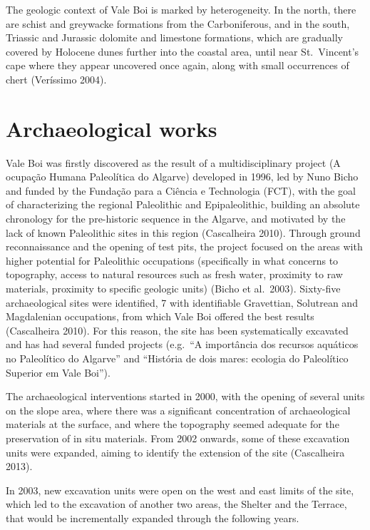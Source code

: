 \documentclass[12pt,twoside]{reedthesis}
\begin{document}
The geologic context of Vale Boi is marked by heterogeneity. In the north, there are schist and greywacke formations from the Carboniferous, and in the south, Triassic and Jurassic dolomite and limestone formations, which are gradually covered by Holocene dunes further into the coastal area, until near St.~Vincent's cape where they appear uncovered once again, along with small occurrences of chert (Veríssimo 2004).

\hypertarget{archaeological-works}{%
\section{Archaeological works}\label{archaeological-works}}

Vale Boi was firstly discovered as the result of a multidisciplinary project (A ocupação Humana Paleolítica do Algarve) developed in 1996, led by Nuno Bicho and funded by the Fundação para a Ciência e Technologia (FCT), with the goal of characterizing the regional Paleolithic and Epipaleolithic, building an absolute chronology for the pre-historic sequence in the Algarve, and motivated by the lack of known Paleolithic sites in this region (Cascalheira 2010). Through ground reconnaissance and the opening of test pits, the project focused on the areas with higher potential for Paleolithic occupations (specifically in what concerns to topography, access to natural resources such as fresh water, proximity to raw materials, proximity to specific geologic units) (Bicho et al.~2003). Sixty-five archaeological sites were identified, 7 with identifiable Gravettian, Solutrean and Magdalenian occupations, from which Vale Boi offered the best results (Cascalheira 2010). For this reason, the site has been systematically excavated and has had several funded projects (e.g.~``A importância dos recursos aquáticos no Paleolítico do Algarve'' and ``História de dois mares: ecologia do Paleolítico Superior em Vale Boi'').

The archaeological interventions started in 2000, with the opening of several units on the slope area, where there was a significant concentration of archaeological materials at the surface, and where the topography seemed adequate for the preservation of in situ materials. From 2002 onwards, some of these excavation units were expanded, aiming to identify the extension of the site (Cascalheira 2013).

In 2003, new excavation units were open on the west and east limits of the site, which led to the excavation of another two areas, the Shelter and the Terrace, that would be incrementally expanded through the following years.
\end{document}
